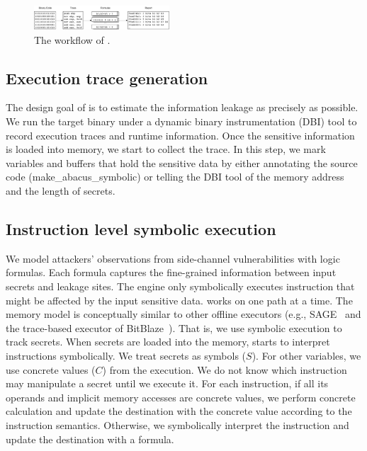 \begin{figure}[t]
    \centering
    \includegraphics[width=0.45\textwidth]{./figures/chapter4/workflow.pdf}
    \caption{The workflow of \tool{}.}
    \label{fig:workflow}
    \vspace*{-15pt}
\end{figure}

\subsection{Execution trace generation} The design goal of \tool{} is to estimate the information leakage as precisely as possible. 
We run the target binary under a dynamic binary instrumentation (DBI) tool
to record execution traces and runtime information.
Once the sensitive information is loaded into memory, we start to collect the trace.
In this step, we mark variables and buffers that hold the sensitive data by either annotating the source code (\textsf{make\_abacus\_symbolic}) or telling the DBI tool of the memory address and the length of secrets.

\subsection{Instruction level symbolic execution} We model attackers'
observations from side-channel vulnerabilities with logic formulas.
Each formula captures the fine-grained information between input
secrets and leakage sites. The engine only symbolically executes
instruction that might be affected by the input sensitive data. \tool{} works on one path at a time. The memory model is conceptually similar to other offline executors (e.g., SAGE~\cite{godefroid2008automated} and the trace-based executor of BitBlaze~\cite{song2008bitblaze}). That is, we use symbolic execution to track secrets. When secrets are loaded into the memory, \tool{} starts to interpret instructions symbolically. We treat secrets as symbols ($S$). For other variables, we use concrete values ($C$) 
from the execution. We do not know which instruction may manipulate a secret until we execute it. For each instruction, if all its operands and implicit memory accesses are concrete values, we perform concrete calculation and update the destination with the concrete value according to the instruction semantics. Otherwise, we symbolically interpret the instruction and update the destination with a formula.

